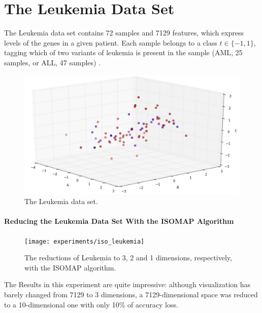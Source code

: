 \clearpage
\section{The Leukemia Data Set}

The Leukemia data set contains 72 samples and 7129 features, which express levels of the genes in a given patient. Each sample belongs to a class $t \in \{-1, 1\}$, tagging which of two variants of leukemia is present in the sample (AML, 25 samples, or ALL, 47 samples) \cite{on:duc_ds}.
\newline\newline

\begin{figure}[H]
	\centering
	\includegraphics[width=\linewidth]{img/datasets/leukemia}
	\captionsetup{justification=centering}
	\caption{The Leukemia data set.}
\end{figure}

\newpage
\paragraph{Reducing the Leukemia Data Set With the ISOMAP Algorithm}

\begin{figure}[H]
	\centering
	\captionsetup{justification=centering}
	\texttt{[image: experiments/iso\_leukemia]}
	\caption{The reductions of Leukemia to 3, 2 and 1 dimensions, respectively, with the ISOMAP algorithm.}
	\label{fig:dsleukemiaiso}
\end{figure}

The Results in this experiment are quite impressive: although visualization has barely changed from 7129 to 3 dimensions, a 7129-dimensional space was reduced to a 10-dimensional one with only 10\% of accuracy loss.


